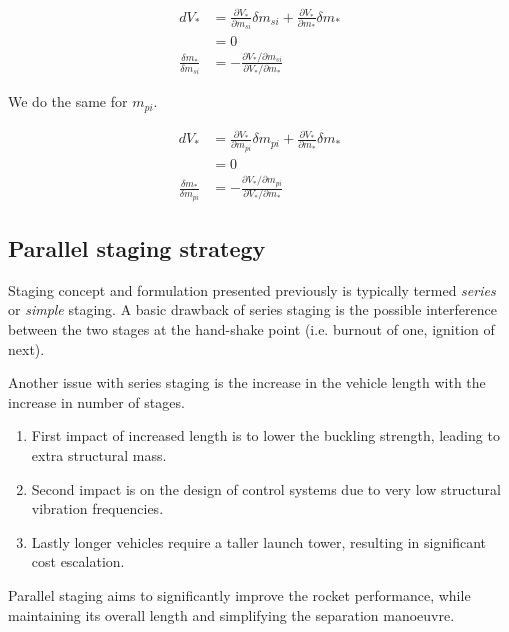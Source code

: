 \documentclass{article}
\theoremstyle{definition}
\begin{document}
\begin{equation}
\begin{split}
   dV_* & = \frac{\partial V_*}{\partial m_{si}} \delta m_{si} + \frac{\partial V_*}{\partial m_{*}} \delta m_{*}\\
   & = 0\\
   \frac{\delta m_*}{\delta m_{si}} & = - \frac{\partial V_*/\partial m_{si}}{\partial V_*/\partial m_{*}}
\end{split}
\end{equation}

We do the same for $m_{pi}$.

\begin{equation}
\begin{split}
   dV_* & = \frac{\partial V_*}{\partial m_{pi}} \delta m_{pi} + \frac{\partial V_*}{\partial m_{*}} \delta m_{*}\\
   & = 0\\
   \frac{\delta m_*}{\delta m_{pi}} & = - \frac{\partial V_*/\partial m_{pi}}{\partial V_*/\partial m_{*}}
\end{split}
\end{equation}


\subsection{Parallel staging strategy}

Staging concept and formulation presented previously is typically termed \emph{series} or \emph{simple} staging.
A basic drawback of series staging is the possible interference between the two stages at the hand-shake point (i.e. burnout of one, ignition of next).

Another issue with series staging is the increase in the vehicle length with the increase in number of stages.

\begin{enumerate}
    \item First impact of increased length is to lower the buckling strength, leading to extra structural mass.
    \item Second impact is on the design of control systems due to very low structural vibration frequencies.
    \item Lastly longer vehicles require a taller launch tower, resulting in significant cost escalation.
\end{enumerate}

Parallel staging aims to significantly improve the rocket performance, while maintaining its overall length and simplifying the separation manoeuvre.
\end{document}
